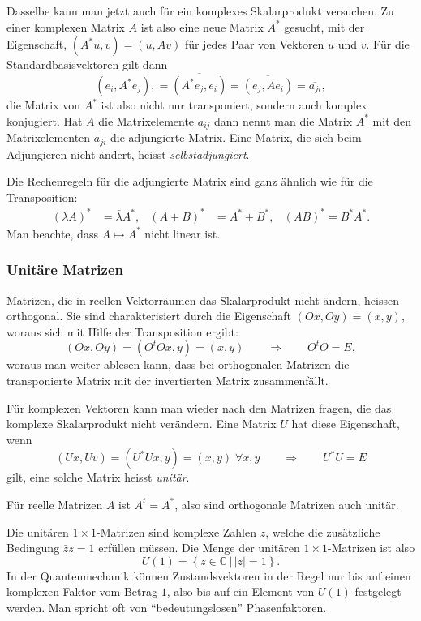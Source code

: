 Dasselbe kann man jetzt auch für ein komplexes Skalarprodukt
versuchen. Zu einer komplexen Matrix $A$ ist also eine neue
Matrix $A^*$ gesucht, mit der Eigenschaft, $(A^*u,v)=(u,Av)$ für 
jedes Paar von Vektoren $u$ und $v$. Für die Standardbasisvektoren
gilt dann
\[
(e_i,A^*e_j),
=
\overline{(A^*e_j, e_i)}
=
\overline{(e_j,Ae_i)}=\overline{a_{ji}},
\]
die Matrix von $A^*$ ist also nicht nur transponiert, sondern auch komplex
konjugiert. Hat $A$ die Ma\-trix\-e\-le\-men\-te $a_{ij}$ dann nennt man
die Matrix $A^*$ mit den Matrixelementen $\bar a_{ji}$ die
adjungierte Matrix. Eine Matrix, die sich beim Adjungieren nicht
ändert, heisst {\em selbstadjungiert}.

Die Rechenregeln für die adjungierte Matrix sind ganz ähnlich wie
für die Transposition:
%
\[
\begin{aligned}
(\lambda A)^*&=\bar\lambda A^*,
&
(A+B)^*&=A^*+B^*,
&
(AB)^*=B^*A^*.
\end{aligned}
\]
Man beachte, dass $A\mapsto A^*$ nicht linear ist.

\subsubsection{Unitäre Matrizen}
Matrizen, die in reellen Vektorräumen das Skalarprodukt nicht ändern,
heissen orthogonal. Sie sind charakterisiert durch die Eigenschaft
%
%
$(Ox,Oy)=(x,y)$, woraus sich mit Hilfe der Transposition ergibt:
\[
(Ox,Oy)=(O^tOx,y)=(x,y)\qquad\Rightarrow\qquad O^tO=E,
\]
woraus man weiter ablesen kann, dass bei orthogonalen Matrizen
die transponierte Matrix mit der invertierten Matrix zusammenfällt.

Für komplexen Vektoren kann man wieder nach den Matrizen fragen, die das
komplexe Skalarprodukt nicht verändern. Eine Matrix $U$ hat diese
Eigenschaft, wenn
\[
(Ux,Uv)=(U^*Ux,y)=(x,y)\;\forall x,y
\qquad\Rightarrow\qquad
U^*U=E
\]
gilt,
eine solche Matrix heisst {\em unitär}. 

Für reelle Matrizen $A$ ist $A^t=A^*$, also sind orthogonale Matrizen
auch unitär.

\begin{beispiel}
Die unitären $1\times 1$-Matrizen sind komplexe Zahlen $z$, welche
die zusätzliche Bedingung $\bar zz=1$ erfüllen müssen.
Die Menge der unitären $1\times 1$-Matrizen ist also
\[
U(1)=\left\{ z\in\mathbb C\,|\, |z|=1
\right\}.
\]
In der Quantenmechanik können Zustandsvektoren in der Regel nur bis auf
einen komplexen Faktor vom Betrag $1$, also bis auf ein Element
von $U(1)$ festgelegt werden.
Man spricht oft von ``bedeutungslosen'' Phasenfaktoren.
\end{beispiel}


